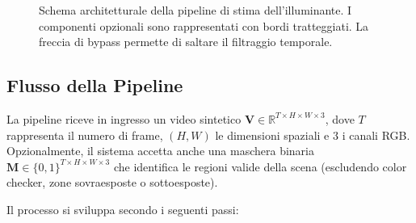 \begin{figure}[ht]
\caption{Schema architetturale della pipeline di stima dell'illuminante. I componenti opzionali sono rappresentati con bordi tratteggiati. La freccia di bypass permette di saltare il filtraggio temporale.}
\label{fig:pipeline_overview}
\end{figure}

\subsection{Flusso della Pipeline}
La pipeline riceve in ingresso un video sintetico $\mathbf{V} \in \mathbb{R}^{T \times H \times W \times 3}$, dove $T$ rappresenta il numero di frame, $(H, W)$ le dimensioni spaziali e $3$ i canali RGB. Opzionalmente, il sistema accetta anche una maschera binaria $\mathbf{M} \in \{0,1\}^{T \times H \times W \times 3}$ che identifica le regioni valide della scena (escludendo color checker, zone sovraesposte o sottoesposte).

Il processo si sviluppa secondo i seguenti passi:

